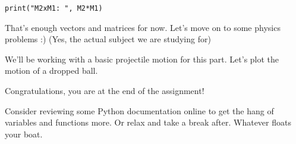 \documentclass[%
oneside,                 %
final,                   %
10pt]{article}
\begin{document}
\begin{verbatim}
print("M2xM1: ", M2*M1) 
\end{verbatim}

That's enough vectors and matrices for now. Let's move on to some physics problems :) 
(Yes, the actual subject we are studying for)

We'll be working with a basic projectile motion for this part. Let's plot the motion of a dropped ball.


Congratulations, you are at the end of the assignment! 

Consider reviewing some Python documentation online to get the hang of variables and functions more. Or relax and take a break after. Whatever floats your boat.

\end{document}
